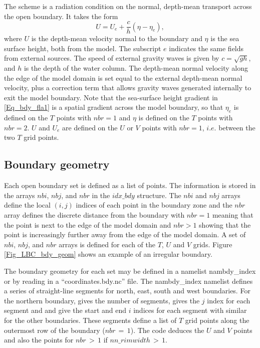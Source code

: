 \documentclass[NEMO_book]{subfiles}
\begin{document}
The \citet{Flather_JPO94} scheme is a radiation condition on the normal, depth-mean
transport across the open boundary. It takes the form
\begin{equation}  \label{Eq_bdy_fla1}
U = U_{e} + \frac{c}{h}\left(\eta - \eta_{e}\right),
\end{equation}
where $U$ is the depth-mean velocity normal to the boundary and $\eta$
is the sea surface height, both from the model. The subscript $e$
indicates the same fields from external sources. The speed of external
gravity waves is given by $c = \sqrt{gh}$, and $h$ is the depth of the
water column. The depth-mean normal velocity along the edge of the
model domain is set equal to the
external depth-mean normal velocity, plus a correction term that
allows gravity waves generated internally to exit the model boundary.
Note that the sea-surface height gradient in \eqref{Eq_bdy_fla1}
is a spatial gradient across the model boundary, so that $\eta_{e}$ is
defined on the $T$ points with $nbr=1$ and $\eta$ is defined on the
$T$ points with $nbr=2$. $U$ and $U_{e}$ are defined on the $U$ or
$V$ points with $nbr=1$, $i.e.$ between the two $T$ grid points.

\subsection{Boundary geometry}
\label{BDY_geometry}

Each open boundary set is defined as a list of points. The information
is stored in the arrays $nbi$, $nbj$, and $nbr$ in the $idx\_bdy$
structure.  The $nbi$ and $nbj$ arrays
define the local $(i,j)$ indices of each point in the boundary zone
and the $nbr$ array defines the discrete distance from the boundary
with $nbr=1$ meaning that the point is next to the edge of the
model domain and $nbr>1$ showing that the point is increasingly
further away from the edge of the model domain. A set of $nbi$, $nbj$,
and $nbr$ arrays is defined for each of the $T$, $U$ and $V$
grids. Figure \ref{Fig_LBC_bdy_geom} shows an example of an irregular
boundary. 

The boundary geometry for each set may be defined in a namelist
nambdy\_index or by reading in a ``coordinates.bdy.nc'' file. The
nambdy\_index namelist defines a series of straight-line segments for
north, east, south and west boundaries. For the northern boundary,
 gives the number of segments,  gives the $j$
index for each segment and  and  give the start
and end $i$ indices for each segment with similar for the other
boundaries. These segments define a list of $T$ grid points along the
outermost row of the boundary ($nbr\,=\, 1$). The code deduces the $U$ and
$V$ points and also the points for $nbr\,>\, 1$ if
$nn\_rimwidth\,>\,1$.
\end{document}
